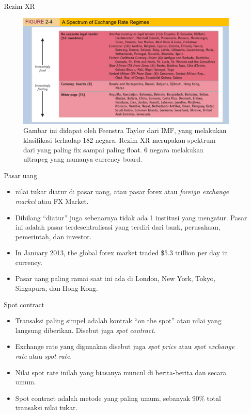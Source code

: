 \documentclass[
  ignorenonframetext,
]{beamer}
\begin{document}
\begin{frame}{Rezim XR}
\label{rezim-xr}
\begin{figure}[H]

{\centering \includegraphics{regime.png}

}

\caption{Gambar ini didapat oleh Feenstra Taylor dari IMF, yang
melakukan klasifikasi terhadap 182 negara. Rezim XR merupakan spektrum
dari yang paling fix sampai paling float. 6 negara melakukan ultrapeg
yang namanya currency board.}

\end{figure}%
\end{frame}

\begin{frame}{Pasar uang}
\label{pasar-uang}
\begin{itemize}
\item
  nilai tukar diatur di pasar uang, atau pasar forex atau \emph{foreign
  exchange market} atau FX Market.
\item
  Dibilang ``diatur'' juga sebenarnya tidak ada 1 institusi yang
  mengatur. Pasar ini adalah pasar terdesentralisasi yang terdiri dari
  bank, perusahaan, pemerintah, dan investor.
\item
  In January 2013, the global forex market traded \$5.3 trillion per day
  in currency.
\item
  Pasar uang paling ramai saat ini ada di London, New York, Tokyo,
  Singapura, dan Hong Kong.
\end{itemize}
\end{frame}

\begin{frame}{Spot contract}
\label{spot-contract}
\begin{itemize}
\item
  Transaksi paling simpel adalah kontrak ``on the spot'' atau nilai yang
  langsung diberikan. Disebut juga \emph{spot contract}.
\item
  Exchange rate yang digunakan disebut juga \emph{spot price} atau
  \emph{spot exchange rate} atau \emph{spot rate}.
\item
  Nilai spot rate inilah yang biasanya muncul di berita-berita dan
  secara umum.
\item
  Spot contract adalah metode yang paling umum, sebanyak 90\% total
  transaksi nilai tukar.
\end{itemize}
\end{frame}
\end{document}
